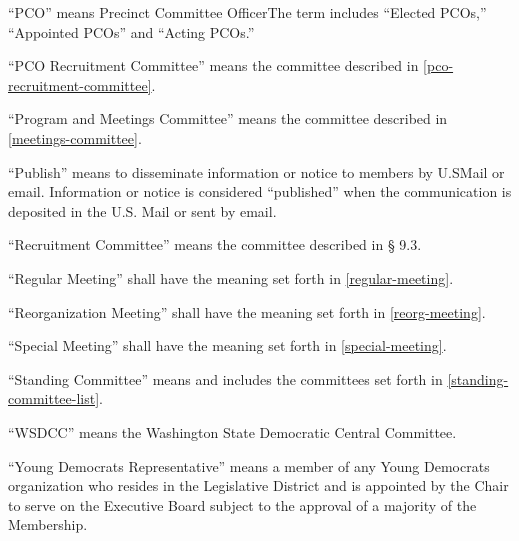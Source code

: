 \begin{alphalist}
    \item “PCO” means Precinct Committee OfficerThe term includes “Elected PCOs,” “Appointed PCOs” and “Acting PCOs.”
    \item “PCO Recruitment Committee” means the committee described in \autoref{pco-recruitment-committee}.
    \item “Program and Meetings Committee” means the committee described in \autoref{meetings-committee}.
    \item “Publish” means to disseminate information or notice to members by U.SMail or email.  Information or notice is considered “published” when the communication is deposited in the U.S. Mail or sent by email.
    \item “Recruitment Committee” means the committee described in § 9.3.
    \item “Regular Meeting” shall have the meaning set forth in \autoref{regular-meeting}.
    \item “Reorganization Meeting” shall have the meaning set forth in \autoref{reorg-meeting}.
    \item “Special Meeting” shall have the meaning set forth in \autoref{special-meeting}.
    \item “Standing Committee” means and includes the committees set forth in \autoref{standing-committee-list}.
    \item “WSDCC” means the Washington State Democratic Central Committee.
    \item “Young Democrats Representative” means a member of any Young Democrats organization who resides in the Legislative District and is appointed by the Chair to serve on the Executive Board subject to the approval of a majority of the Membership.
\end{alphalist}

